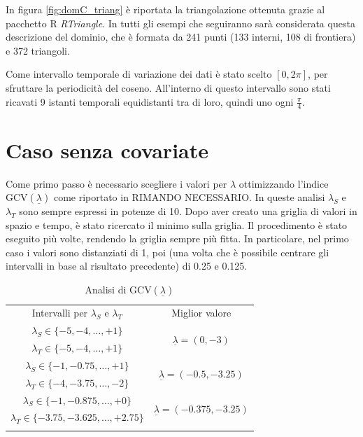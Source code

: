 \documentclass[a4paper,11pt,twoside,openright]{book}							%
\begin{document}
In figura \ref{fig:domC_triang} è riportata la triangolazione ottenuta grazie al pacchetto R \textit{RTriangle}. In tutti gli esempi che seguiranno sarà considerata questa descrizione del dominio, che è formata da 241 punti (133 interni, 108 di frontiera) e 372 triangoli.

Come intervallo temporale di variazione dei dati è stato scelto $[0,2\pi]$, per sfruttare la periodicità del coseno. All'interno di questo intervallo sono stati ricavati 9 istanti temporali equidistanti tra di loro, quindi uno ogni $\frac{\pi}{4}$.

\section{Caso senza covariate}
Come primo passo è necessario scegliere i valori per $\lambda$ ottimizzando l'indice $\mathrm{GCV}(\underline \lambda)$ come riportato in RIMANDO NECESSARIO. In queste analisi $\lambda_S$ e $\lambda_T$ sono sempre espressi in potenze di 10. Dopo aver creato una griglia di valori in spazio e tempo, è stato ricercato il minimo sulla griglia. Il procedimento è stato eseguito più volte, rendendo la griglia sempre più fitta. In particolare, nel primo caso i valori sono distanziati di 1, poi (una volta che è possibile centrare gli intervalli in base al risultato precedente) di 0.25 e 0.125.

\begin{table}[htbp]
\renewcommand{\arraystretch}{1.3}
\setlength{\tabcolsep}{2mm}
\centering
	\begin{tabular}{!{\vrule width 1.2pt}c!{\vrule width 1.2pt}c!{\vrule width 1.2pt}}
	Intervalli per $\lambda_S$ e $\lambda_T$& Miglior valore											\\
	$\lambda_S \in \{-5,-4,\ldots,+1\}$ 	&  			\\
	$\lambda_T \in \{-5,-4,\ldots,+1\}$		& 															\\	
	$\lambda_S \in \{-1,-0.75,\ldots,+1\}$ 	&  		\\
	$\lambda_T \in \{-4,-3.75,\ldots,-2\}$	& 															\\	
	$\lambda_S \in \{-1,-0.875,\ldots,+0\}$ 	& 	\\
	$\lambda_T \in \{-3.75,-3.625,\ldots,+2.75\}$		& 												\\	
	\end{tabular}
\caption{Analisi di $\mathrm{GCV}(\underline \lambda)$}
\end{table}
\end{document}
